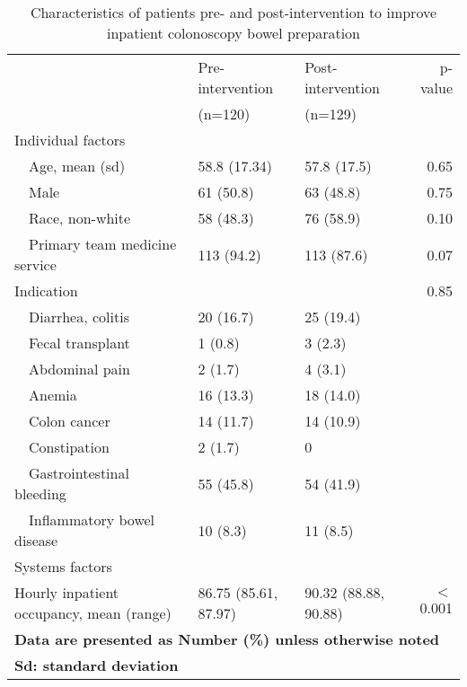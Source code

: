 %
\hypertarget{Characteristics of patients pre- and post-intervention to improve inpatient colonoscopy bowel preparation}{}
 \begin{table}
  \centering
  \caption{Characteristics of patients pre- and post-intervention to improve inpatient colonoscopy bowel preparation}
  \label{table:character}
    \begin{tiny}
    \begin{tabular}{lllr} \hline
    & Pre-intervention & Post-intervention & p-value \\
    & (n=120) & (n=129) & \\ \hline
    Individual factors & & & \\
    \ \ Age, mean (sd) & 58.8 (17.34) & 57.8 (17.5) & 0.65\\
    \ \ Male & 61 (50.8) & 63 (48.8) & 0.75 \\
    \ \ Race, non-white & 58 (48.3) & 76 (58.9) & 0.10 \\
    \ \ Primary team medicine service & 113 (94.2) & 113 (87.6) & 0.07 \\
    Indication & & & 0.85 \\
    \ \ Diarrhea, colitis & 20 (16.7) & 25 (19.4) & \\
    \ \ Fecal transplant & 1 (0.8) & 3 (2.3) & \\
    \ \ Abdominal pain & 2 (1.7) & 4 (3.1) & \\
    \ \ Anemia & 16 (13.3) & 18 (14.0) & \\
    \ \ Colon cancer & 14 (11.7) & 14 (10.9) & \\
    \ \ Constipation & 2 (1.7) & 0 & \\
    \ \ Gastrointestinal bleeding & 55 (45.8) & 54 (41.9) & \\
    \ \ Inflammatory bowel disease & 10 (8.3) & 11 (8.5) & \\
    Systems factors & & & \\
    Hourly inpatient occupancy, mean (range) & 86.75 (85.61, 87.97) & 90.32 (88.88, 90.88) & $<$ 0.001 \\ \hline
    \multicolumn{4}{l}{\textbf{Data are presented as Number (\%) unless otherwise noted}}\\
    \multicolumn{4}{l}{\textbf{Sd: standard deviation}}\\
    \end{tabular}
    \end{tiny}
 \end{table}
% 